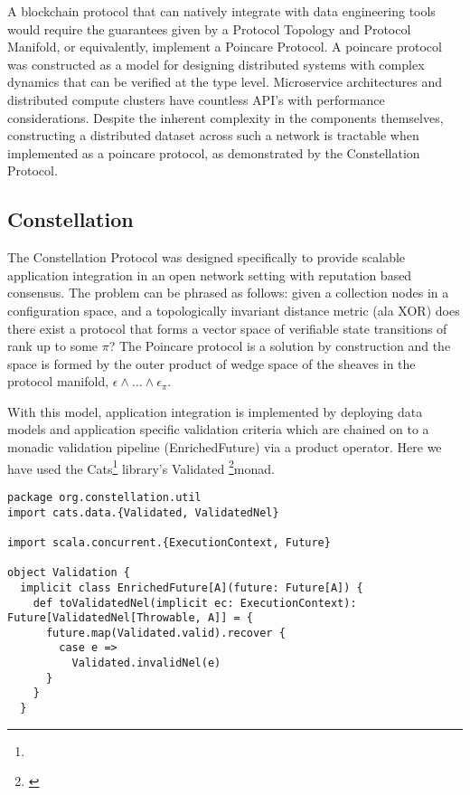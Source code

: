 \documentclass{article}
\begin{document}
A blockchain protocol that can natively integrate with data engineering tools would require the guarantees given by a Protocol Topology and Protocol Manifold, or equivalently, implement a Poincare Protocol. A poincare protocol was constructed as a model for designing distributed systems with complex dynamics that can be verified at the type level. Microservice architectures and distributed compute clusters have countless API's with performance considerations. Despite the inherent complexity in the components themselves, constructing a distributed dataset across such a network is tractable when implemented as a poincare protocol, as demonstrated by the Constellation Protocol.

\subsection{Constellation} 
The Constellation Protocol was designed specifically to provide scalable application integration in an open network setting with reputation based consensus. The problem can be phrased as follows: given a collection nodes in a configuration space, and a topologically invariant distance metric (ala XOR) does there exist a protocol that forms a vector space of verifiable state transitions of rank up to some $\pi$? The Poincare protocol is a solution by construction and the space is formed by the outer product of wedge space of the sheaves in the protocol manifold, $\epsilon \wedge \dots \wedge \epsilon_\pi$.

With this model, application integration is implemented by deploying data models and application specific validation criteria which are chained on to a monadic validation pipeline (EnrichedFuture) via a product operator. Here we have used the Cats\footnote{} library's Validated \footnote{\url{}}monad. 

\begin{lstlisting}[style=myScalastyle]
package org.constellation.util
import cats.data.{Validated, ValidatedNel}

import scala.concurrent.{ExecutionContext, Future}

object Validation {
  implicit class EnrichedFuture[A](future: Future[A]) {
    def toValidatedNel(implicit ec: ExecutionContext): Future[ValidatedNel[Throwable, A]] = {
      future.map(Validated.valid).recover {
        case e =>
          Validated.invalidNel(e)
      }
    }
  }
\end{lstlisting}
\end{document}
